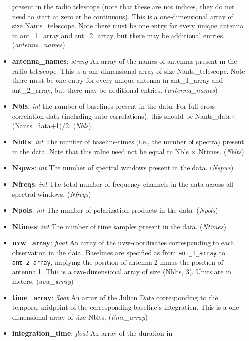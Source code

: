 \documentclass[11pt, oneside]{article}
\begin{document}
\begin{itemize}
  present in the radio telescope (note that these are not indices, they do not need to start at zero
  or be continuous). This is a one-dimensional array of size
  Nants\_telescope. Note there must be one entry for every unique antenna in
  ant\_1\_array and ant\_2\_array, but there may be additional
  entries. (\textit{antenna\_names})
\item \textbf{antenna\_names}: \textit{string} An array of the names of antennas
  present in the radio telescope. This is a one-dimensional array of size
  Nants\_telescope. Note there must be one entry for every unique antenna in
  ant\_1\_array and ant\_2\_array, but there may be additional
  entries. (\textit{antenna\_names})
\item \textbf{Nbls}: \textit{int} the number of baselines present in the
  data. For full cross-correlation data (including auto-correlations), this
  should be Nants\_data$\times$(Nants\_data+1)/2. (\textit{Nbls})
\item \textbf{Nblts}: \textit{int} The number of baseline-times (i.e., the
  number of spectra) present in the data. Note that this value need not be equal
  to Nbls $\times$ Ntimes. (\textit{Nblts})
\item \textbf{Nspws}: \textit{int} The number of spectral windows present in the
  data. (\textit{Nspws})
\item \textbf{Nfreqs}: \textit{int} The total number of frequency channels in
  the data across all spectral windows. (\textit{Nfreqs})
\item \textbf{Npols}: \textit{int} The number of polarization products in the
  data. (\textit{Npols})
\item \textbf{Ntimes}: \textit{int} The number of time samples present in the
  data. (\textit{Ntimes})
\item \textbf{uvw\_array}: \textit{float} An array of the uvw-coordinates
  corresponding to each observation in the data. Baselines are specified as from
  \verb+ant_1_array+ to \verb+ant_2_array+, implying the position of antenna 2
  minus the position of antenna 1. This is a two-dimensional array of size
  (Nblts, 3). Units are in meters. (\textit{uvw\_array})
\item \textbf{time\_array}: \textit{float} An array of the Julian Date
  corresponding to the temporal midpoint of the corresponding baseline's
  integration. This is a one-dimensional array of size
  Nblts. (\textit{time\_array})
\item \textbf{integration\_time}: \textit{float} An array of the duration in

\end{itemize}
\end{document}
